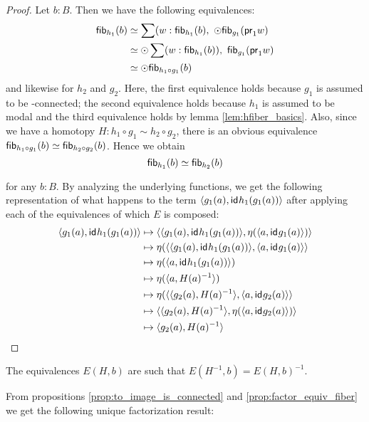 \begin{proof}
Let $b:B$. Then we have the following equivalences:
\begin{align*}
\mathsf{fib}_{h_1}(b) & \simeq \sum(w:\mathsf{fib}_{h_1}(b),\ \odot \mathsf{fib}_{g_1}(\mathsf{pr}_{1} w)\\
& \simeq \odot\sum(w:\mathsf{fib}_{h_1}(b)),\ \mathsf{fib}_{g_1}(\mathsf{pr}_{1} w)\\
& \simeq \odot\mathsf{fib}_{h_1\circ g_1}(b)
\end{align*}
and likewise for $h_2$ and $g_2$. Here, the first equivalence holds because $g_1$ is assumed to be \modal-connected; the second equivalence
holds because $h_1$ is assumed to be modal and the third equivalence holds by lemma \ref{lem:hfiber_basics}. Also, since we have a
homotopy $H:h_1\circ g_1\sim h_2\circ g_2$, there is an obvious equivalence $\mathsf{fib}_{h_1\circ g_1}(b)\simeq\mathsf{fib}_{h_2\circ g_2}(b)$. Hence we
obtain
\begin{equation*}
\mathsf{fib}_{h_1}(b)\simeq\mathsf{fib}_{h_2}(b)
\end{equation*}
               
for any $b:B$. By analyzing the underlying functions, we get the following representation of what happens to the term
${\langle g_1(a),\mathsf{id}_{}{h_1(g_1(a))}\rangle}$ after applying each of the equivalences of which $E$ is composed:
\begin{align*}
\pairr{g_1(a),\idfunc{h_1(g_1(a))}} & 
    \mapsto \pairr{\pairr{g_1(a),\idfunc{h_1(g_1(a))}}, \eta( \pairr{a,\idfunc{g_1(a)}} )}\\
  & \mapsto \eta( \pairr{\pairr{g_1(a),\idfunc{h_1(g_1(a))}}, \pairr{a,\idfunc{g_1(a)}} }\\
  & \mapsto \eta( \pairr{a,\idfunc{h_1(g_1(a))}})\\
  & \mapsto \eta( \pairr{a,H(a)^{-1}})\\
  & \mapsto \eta( \pairr{\pairr{g_2(a),H(a)^{-1}},\pairr{a,\idfunc{g_2(a)}}}\\
  & \mapsto \pairr{\pairr{g_2(a),H(a)^{-1}}, \eta(\pairr{a,\idfunc{g_2(a)}}) }\\
  & \mapsto \pairr{g_2(a),H(a)^{-1}}
\end{align*}
\end{proof}

The equivalences $E(H,b)$ are such that $E(H^{-1},b)= E(H,b)^{-1}$.

From propositions \ref{prop:to_image_is_connected} and \ref{prop:factor_equiv_fiber} we get the following unique factorization result:


